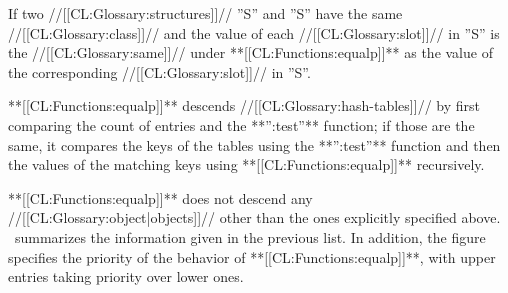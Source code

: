 If two //[[CL:Glossary:structures]]// ''S'' and ''S'' have the same //[[CL:Glossary:class]]// and the value of each //[[CL:Glossary:slot]]// in ''S'' is the //[[CL:Glossary:same]]// under **[[CL:Functions:equalp]]** as the value of the corresponding //[[CL:Glossary:slot]]// in ''S''.


**[[CL:Functions:equalp]]** descends //[[CL:Glossary:hash-tables]]// by first comparing the count of entries and the **'':test''** function; if those are the same, it compares the keys of the tables using the **'':test''** function and then the values of the matching keys using **[[CL:Functions:equalp]]** recursively.

\endlist

**[[CL:Functions:equalp]]** does not descend any //[[CL:Glossary:object|objects]]// other than the ones explicitly specified above. \Thenextfigure\ summarizes the information given in the previous list. In addition, the figure specifies the priority of the behavior of **[[CL:Functions:equalp]]**, with upper entries taking priority over lower ones.


